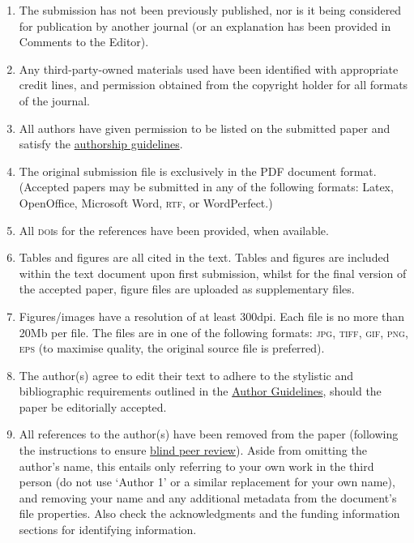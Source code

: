 \documentclass[cm,linguex]{glossa}
\begin{document}
\begin{enumerate}
\def\labelenumi{\arabic{enumi}.}
\item
  The submission has not been previously published, nor is it being
  considered for publication by another journal (or an explanation has
  been provided in Comments to the Editor).
\item
  Any third-party-owned materials used have been identified with
  appropriate credit lines, and permission obtained from the copyright
  holder for all formats of the journal.
\item
  All authors have given permission to be listed on the submitted paper
  and satisfy the
  \href{http://glossa.ubiquitypress.com/about/authorship/}{authorship
  guidelines}.
\item
  The original submission file is exclusively in the PDF document
  format. (Accepted papers may be submitted in any of the following
  formats: Latex, OpenOffice, Microsoft Word, \textsc{rtf}, or
  WordPerfect.)
\item
  All \textsc{doi}s for the references have been provided, when
  available.
\item
  Tables and figures are all cited in the text. Tables and figures are
  included within the text document upon first submission, whilst for
  the final version of the accepted paper, figure files are uploaded as
  supplementary files.
\item
  Figures/images have a resolution of at least 300dpi. Each file is no
  more than 20Mb per file. The files are in one of the following
  formats: \textsc{jpg, tiff, gif, png, eps} (to maximise quality, the
  original source file is preferred).
\item
  The author(s) agree to edit their text to adhere to the stylistic and
  bibliographic requirements outlined in the
  \href{https://www.glossa-journal.org/about/submissions\#authorGuidelines}{Author
  Guidelines}, should the paper be editorially accepted.
\item
  All references to the author(s) have been removed from the paper
  (following the instructions to ensure
  \href{https://www.glossa-journal.org/help/view/editorial/topic/000044}{blind
  peer review}). Aside from omitting the author's name, this entails
  only referring to your own work in the third person (do not use
  `Author 1' or a similar replacement for your own name), and removing
  your name and any additional metadata from the document's file
  properties. Also check the acknowledgments and the funding information
  sections for identifying information.
\end{enumerate}
\end{document}
